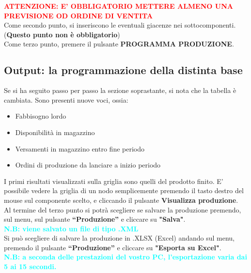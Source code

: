 \documentclass[12pt,twoside]{report}
\newcommand{\coloredbold}[2]{\textcolor{#1}{\textbf{#2}}}
\begin{document}
\coloredbold{red}{ATTENZIONE: E' OBBLIGATORIO METTERE ALMENO UNA PREVISIONE OD ORDINE DI VENTITA}\\

Come secondo punto, si inseriscono le eventuali giacenze nei sottocomponenti. (\textbf{Questo punto non è obbligatorio})\\

Come terzo punto, premere il pulsante \textbf{PROGRAMMA PRODUZIONE}.

\subsection{Output: la programmazione della distinta base}

Se si ha seguito passo per passo la sezione soprastante, si nota che la tabella è cambiata.
Sono presenti nuove voci, ossia:
\begin{itemize}
	
	\item Fabbisogno lordo
	\item Disponibilità in magazzino
	\item Versamenti in magazzino entro fine periodo 
	\item Ordini di produzione da lanciare a inizio periodo
	      
\end{itemize}

I primi risultati visualizzati sulla griglia sono quelli del prodotto finito. E' possibile vedere la griglia di un nodo semplicemente premendo il tasto destro del mouse sul componente scelto, e cliccando il pulsante \textbf{Visualizza produzione}.\\

Al termine del terzo punto si potrà scegliere se salvare la produzione premendo, sul menu, sul pulsante \textbf{“Produzione”} e cliccare su \textbf{"Salva"}. \\
\coloredbold{cyan}{N.B: viene salvato un file di tipo .XML}\\

Si può scegliere di salvare la produzione in .XLSX (Excel) andando sul menu, premendo il pulsante \textbf{“Produzione”} e cliccare su \textbf{"Esporta su Excel"}. \\
\coloredbold{cyan}{N.B: a seconda delle prestazioni del vostro PC, l'esportazione varia dai 5 ai 15 secondi.}\\


\end{document}
